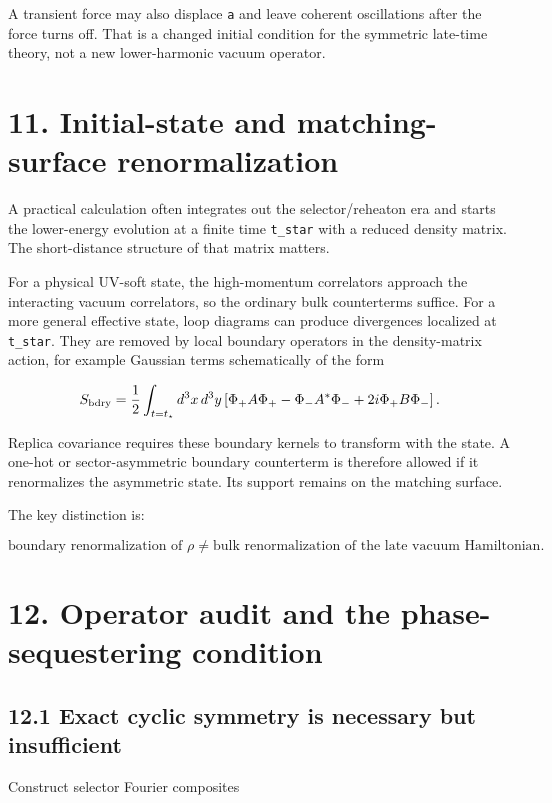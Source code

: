 \documentclass[
  10pt,
  a4paper,
]{article}
\begin{document}
A transient force may also displace \texttt{a} and leave coherent
oscillations after the force turns off. That is a changed initial
condition for the symmetric late-time theory, not a new lower-harmonic
vacuum operator.

\section{11. Initial-state and matching-surface
renormalization}\label{initial-state-and-matching-surface-renormalization}

A practical calculation often integrates out the selector/reheaton era
and starts the lower-energy evolution at a finite time \texttt{t\_star}
with a reduced density matrix. The short-distance structure of that
matrix matters.

For a physical UV-soft state, the high-momentum correlators approach the
interacting vacuum correlators, so the ordinary bulk counterterms
suffice. For a more general effective state, loop diagrams can produce
divergences localized at \texttt{t\_star}. They are removed by local
boundary operators in the density-matrix action, for example Gaussian
terms schematically of the form

\[
S_{\rm bdry}
=
\frac12\int_{t=t_\star}d^3x\,d^3y
\left[
\Phi_+ A\Phi_+
-\Phi_- A^*\Phi_-
+2i\Phi_+B\Phi_-
\right].
\]

Replica covariance requires these boundary kernels to transform with the
state. A one-hot or sector-asymmetric boundary counterterm is therefore
allowed if it renormalizes the asymmetric state. Its support remains on
the matching surface.

The key distinction is:

\[
\boxed{
\text{boundary renormalization of }\rho
\ne
\text{bulk renormalization of the late vacuum Hamiltonian}.
}
\]

\section{12. Operator audit and the phase-sequestering
condition}\label{operator-audit-and-the-phase-sequestering-condition}

\subsection{12.1 Exact cyclic symmetry is necessary but
insufficient}\label{exact-cyclic-symmetry-is-necessary-but-insufficient}

Construct selector Fourier composites
\end{document}
